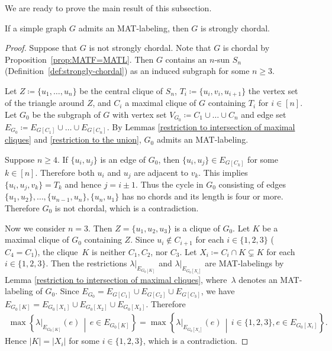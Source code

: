 We are ready to prove the main result of this subsection.
\begin{theorem}
\label{thm:main-1} 
If a simple graph $G$ admits an MAT-labeling, then $G$ is strongly chordal.  
\end{theorem}
\begin{proof}
Suppose that $ G $ is not strongly chordal. 
Note that $G$ is chordal by Proposition~\ref{prop:MATF=MATL}.
Then $ G $ contains an $ n $-sun $ S_{n} $ (Definition~\ref{def:strongly-chordal}) as an induced subgraph for some $ n \geq 3 $.

Let $ Z \coloneqq \{u_{1}, \dots, u_{n}\} $ be the central clique of $ S_{n} $, $ T_{i} \coloneqq \{u_{i}, v_{i}, u_{i+1}\} $ the vertex set of the triangle around $ Z $, and $ C_{i} $ a maximal clique of $ G $ containing $ T_{i} $ for $ i \in [n]$. 
Let $ G_{0} $ be the subgraph of $ G $ with vertex set $ V_{G_{0}} \coloneqq C_{1} \cup \dots \cup C_{n} $ and edge set $ E_{G_{0}} \coloneqq E_{G[C_{1}]} \cup \dots \cup E_{G[C_{n}]} $. 
By Lemmas \ref{restriction to intersection of maximal cliques} and \ref{restriction to the union}, $ G_{0} $ admits an MAT-labeling. 

Suppose $ n \geq 4 $. 
If $ \{u_{i}, u_{j}\} $ is an edge of $ G_{0} $, then $ \{u_{i}, u_{j}\} \in E_{G[C_{k}]} $ for some $ k \in [n]$. 
Therefore  both $ u_{i} $ and $ u_{j} $ are adjacent to $ v_{k} $. 
This implies $ \{u_{i}, u_{j}, v_{k}\} = T_{k} $ and hence $ j = i \pm 1 $. 
Thus the cycle in $ G_{0} $ consisting of edges $ \{u_{1}, u_{2}\}, \dots, \{u_{n-1}, u_{n}\}, \{u_{n}, u_{1}\} $ has no chords and its length is four or more. 
Therefore $ G_{0} $ is not chordal, which is a contradiction. 

Now we consider $ n = 3 $. 
Then $ Z = \{u_{1}, u_{2}, u_{3}\} $ is a clique of $ G_{0} $. 
Let $ K $ be a maximal clique of $ G_{0} $ containing $ Z $. 
Since $ u_{i} \not\in C_{i+1} $ for each $ i \in \{1,2,3\} $  ($C_4=C_1$), the clique~$ K $ is neither $ C_{1}, C_{2} $, nor $ C_{3} $. 
Let $ X_{i} \coloneqq C_{i} \cap K \subsetneq K$ for each $ i \in \{1,2,3\} $. 
Then the restrictions $ \lambda|_{E_{G_{0}[K]}} $ and $ \lambda|_{E_{G_{0}[X_{i}]}}$ are MAT-labelings by Lemma \ref{restriction to intersection of maximal cliques}, where~$ \lambda $ denotes an MAT-labeling of $ G_{0} $. 
Since $ E_{G_{0}} = E_{G[C_{1}]} \cup E_{G[C_{2}]} \cup E_{G[C_{3}]} $, we have $ E_{G_{0}[K]} = E_{G_{0}[X_{1}]} \cup E_{G_{0}[X_{2}]} \cup E_{G_{0}[X_{3}]} $. 
Therefore 
\begin{align*}
\max\left\{\lambda|_{E_{G_{0}[K]}}(e) \, \middle| \,  e \in E_{G_{0}[K]}\right\}
= \max\left\{ \lambda|_{E_{G_{0}[X_{i}]}}(e) \, \middle| \, i \in \{1,2,3\}, e \in E_{G_{0}[X_{i}]}\right\}. 
\end{align*}
Hence $ |K| = |X_{i}| $ for some $ i \in \{1,2,3\} $, which is a contradiction. 
\end{proof}

